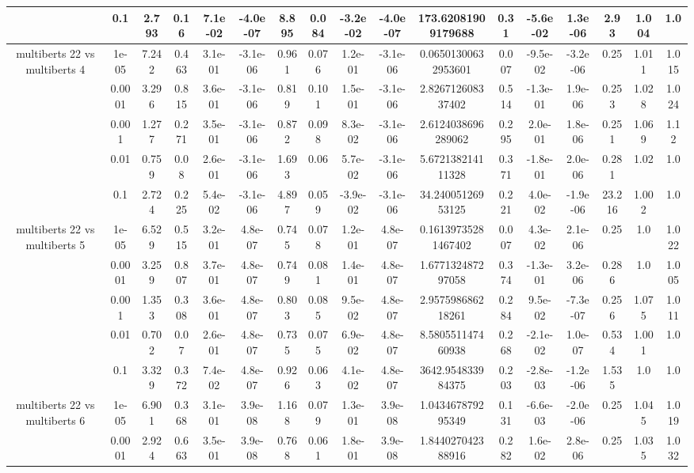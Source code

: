 \begin{tabular}{|c|c|c|c|c|c|c|c|c|c|c|c|c|c|c|c|c|}
 & 0.1 & 2.793 & 0.16 & 7.1e-02 & -4.0e-07 & 8.895 & 0.084 & -3.2e-02 & -4.0e-07 & 173.62081909179688 & 0.31 & -5.6e-02 & 1.3e-06 & 2.93 & 1.004 & 1.0 \\
\hline
\multirow{5}{*}{multiberts 22 vs multiberts 4} & 1e-05 & 7.242 & 0.463 & 3.1e-01 & -3.1e-06 & 0.961 & 0.076 & 1.2e-01 & -3.1e-06 & 0.06501300632953601 & 0.007 & -9.5e-02 & -3.2e-06 & 0.25 & 1.011 & 1.015 \\
 & 0.0001 & 3.296 & 0.815 & 3.6e-01 & -3.1e-06 & 0.819 & 0.101 & 1.5e-01 & -3.1e-06 & 2.826712608337402 & 0.514 & -1.3e-01 & 1.9e-06 & 0.253 & 1.028 & 1.024 \\
 & 0.001 & 1.277 & 0.271 & 3.5e-01 & -3.1e-06 & 0.872 & 0.098 & 8.3e-02 & -3.1e-06 & 2.6124038696289062 & 0.295 & 2.0e-01 & 1.8e-06 & 0.251 & 1.069 & 1.12 \\
 & 0.01 & 0.759 & 0.08 & 2.6e-01 & -3.1e-06 & 1.693 & 0.06 & 5.7e-02 & -3.1e-06 & 5.672138214111328 & 0.371 & -1.8e-01 & 2.0e-06 & 0.281 & 1.02 & 1.0 \\
 & 0.1 & 2.724 & 0.225 & 5.4e-02 & -3.1e-06 & 4.897 & 0.059 & -3.9e-02 & -3.1e-06 & 34.24005126953125 & 0.221 & 4.0e-02 & -1.9e-06 & 23.216 & 1.002 & 1.0 \\
\hline
\multirow{5}{*}{multiberts 22 vs multiberts 5} & 1e-05 & 6.529 & 0.515 & 3.2e-01 & 4.8e-07 & 0.745 & 0.078 & 1.2e-01 & 4.8e-07 & 0.16139735281467402 & 0.007 & 4.3e-02 & 2.1e-06 & 0.25 & 1.0 & 1.022 \\
 & 0.0001 & 3.259 & 0.807 & 3.7e-01 & 4.8e-07 & 0.749 & 0.081 & 1.4e-01 & 4.8e-07 & 1.677132487297058 & 0.374 & -1.3e-01 & 3.2e-06 & 0.286 & 1.0 & 1.005 \\
 & 0.001 & 1.353 & 0.308 & 3.6e-01 & 4.8e-07 & 0.803 & 0.085 & 9.5e-02 & 4.8e-07 & 2.957598686218261 & 0.284 & 9.5e-02 & -7.3e-07 & 0.256 & 1.075 & 1.011 \\
 & 0.01 & 0.702 & 0.07 & 2.6e-01 & 4.8e-07 & 0.735 & 0.075 & 6.9e-02 & 4.8e-07 & 8.580551147460938 & 0.268 & -2.1e-02 & 1.0e-07 & 0.534 & 1.001 & 1.0 \\
 & 0.1 & 3.329 & 0.372 & 7.4e-02 & 4.8e-07 & 0.926 & 0.063 & 4.1e-02 & 4.8e-07 & 3642.954833984375 & 0.203 & -2.8e-03 & -1.2e-06 & 1.535 & 1.0 & 1.0 \\
\hline
\multirow{5}{*}{multiberts 22 vs multiberts 6} & 1e-05 & 6.901 & 0.368 & 3.1e-01 & 3.9e-08 & 1.168 & 0.079 & 1.3e-01 & 3.9e-08 & 1.043467879295349 & 0.131 & -6.6e-03 & -2.0e-06 & 0.25 & 1.045 & 1.019 \\
 & 0.0001 & 2.924 & 0.663 & 3.5e-01 & 3.9e-08 & 0.768 & 0.061 & 1.8e-01 & 3.9e-08 & 1.844027042388916 & 0.282 & 1.6e-02 & 2.8e-06 & 0.25 & 1.035 & 1.032 \\

\end{tabular}
